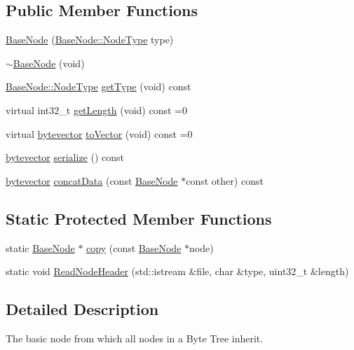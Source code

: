 \subsection*{Public Member Functions}
\begin{DoxyCompactItemize}
\item 
\hyperlink{class_base_node_afc5bd25898054b2e50d6b01451d73b1b}{Base\-Node} (\hyperlink{class_base_node_a01f9336072c3fb197a2a0dda45d78544}{Base\-Node\-::\-Node\-Type} type)
\item 
\hyperlink{class_base_node_a27d5e3b508b19fa7887ac95d15a46f9c}{$\sim$\-Base\-Node} (void)
\item 
\hyperlink{class_base_node_a01f9336072c3fb197a2a0dda45d78544}{Base\-Node\-::\-Node\-Type} \hyperlink{class_base_node_a080bb4228cc6b0239f29c033257c486e}{get\-Type} (void) const 
\item 
virtual int32\-\_\-t \hyperlink{class_base_node_a50aef77f988f7689e96b346705628f91}{get\-Length} (void) const =0
\item 
virtual \hyperlink{types_8h_a64b5be62be31dcda165d2c6c3c262fb5}{bytevector} \hyperlink{class_base_node_aad2eb87014be9a786ec9a4c4ac405c45}{to\-Vector} (void) const =0
\item 
\hyperlink{types_8h_a64b5be62be31dcda165d2c6c3c262fb5}{bytevector} \hyperlink{class_base_node_aa5206e6e347794cba4068ddd90b8a091}{serialize} () const 
\item 
\hyperlink{types_8h_a64b5be62be31dcda165d2c6c3c262fb5}{bytevector} \hyperlink{class_base_node_ab9ec930839c38803c8be0638c7096982}{concat\-Data} (const \hyperlink{class_base_node}{Base\-Node} $\ast$const other) const 
\end{DoxyCompactItemize}
\subsection*{Static Protected Member Functions}
\begin{DoxyCompactItemize}
\item 
static \hyperlink{class_base_node}{Base\-Node} $\ast$ \hyperlink{class_base_node_ae7b4733f4f9eae9979dc9d8469d51c28}{copy} (const \hyperlink{class_base_node}{Base\-Node} $\ast$node)
\item 
static void \hyperlink{class_base_node_ae2e188a31e6eb5d04caa4e57314a7f51}{Read\-Node\-Header} (std\-::istream \&file, char \&type, uint32\-\_\-t \&length)
\end{DoxyCompactItemize}


\subsection{Detailed Description}
The basic node from which all nodes in a Byte Tree inherit. 

